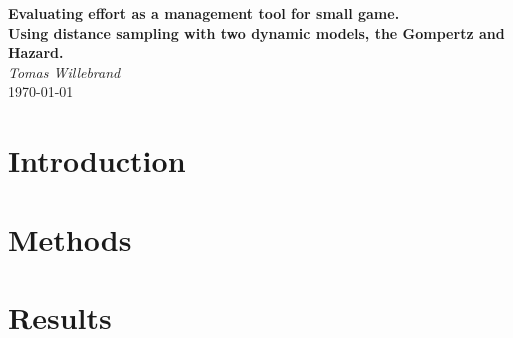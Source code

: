 \documentclass[12pt,a4paper,final,abstract=true,headings=small]{scrartcl}
\begin{document}
\begin{titlepage}
    \begin{center}
        \textbf{\Huge Evaluating effort as a management tool for small game.} \\
        \vspace*{2cm}
        \textbf{\Large Using distance sampling with two dynamic models, the Gompertz and Hazard.} \\
        \vspace*{5cm}
        \emph{\Large Tomas Willebrand} \\
        \today
    \end{center}
\end{titlepage}




\section{Introduction}



\section{Methods}


%
% 
% 
% 



\section*{Results}
\end{document}
